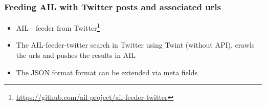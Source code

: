 \begin{frame}[fragile]                                                                                                                        
   \frametitle{Feeding AIL with Twitter posts and associated urls}
        \begin{itemize}
                \item AIL - feeder from Twitter\footnote{\url{https://github.com/ail-project/ail-feeder-twitter}}
                \item The AIL-feeder-twitter search in Twitter using Twint (without API), crawls the urls and pushes the results in AIL
                \item The JSON format format can be extended via meta fields
        \end{itemize}
\end{frame}
